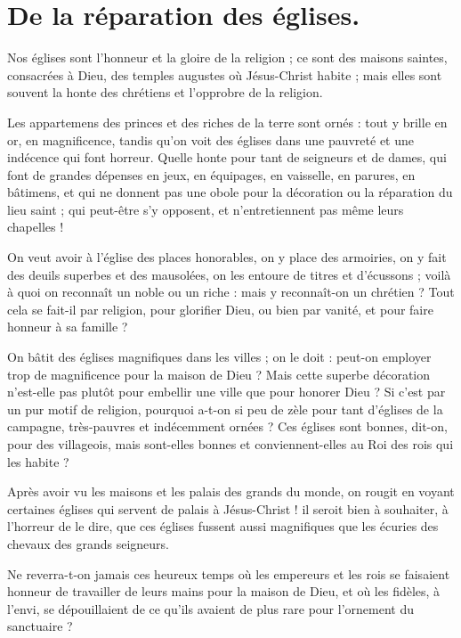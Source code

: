 \documentclass[instructions.tex]{subfiles}
\begin{document}
 
\chapter{De la réparation des églises.}
 
\primo Nos églises sont l’honneur et la gloire de la religion ; ce sont des maisons saintes, consacrées à Dieu, des temples augustes où Jésus-Christ habite ; mais elles sont souvent la honte des chrétiens et l’opprobre de la religion.
 
Les appartemens des princes et des riches de la terre sont ornés : tout y brille en or, en magnificence, tandis qu’on voit des églises dans une pauvreté et une indécence qui font horreur. Quelle honte pour tant de seigneurs et de dames, qui font de grandes dépenses en jeux, en équipages, en vaisselle, en parures, en bâtimens, et qui ne donnent pas une obole pour la décoration ou la réparation du lieu saint ; qui peut-être s’y opposent, et n’entretiennent pas même leurs chapelles !
 
On veut avoir à l’église des places honorables, on y place des armoiries, on y fait des deuils superbes et des mausolées, on les entoure de titres et d’écussons ; voilà à quoi on reconnaît un noble ou un riche : mais y reconnaît-on un chrétien ? Tout cela se fait-il par religion, pour glorifier Dieu, ou bien par vanité, et pour faire honneur à sa famille ?
 
On bâtit des églises magnifiques dans les villes ; on le doit : peut-on employer trop de magnificence pour la maison de Dieu ? Mais cette superbe décoration n’est-elle pas plutôt pour embellir une ville que pour honorer Dieu ? Si c’est par un pur motif de religion, pourquoi a-t-on si peu de zèle pour tant d’églises de la campagne, très-pauvres et indécemment ornées ? Ces églises sont bonnes, dit-on, pour des villageois, mais sont-elles bonnes et conviennent-elles au Roi des rois qui les habite ?
 
Après avoir vu les maisons et les palais des grands du monde, on rougit en voyant certaines églises qui servent de palais à Jésus-Christ ! il seroit bien à souhaiter, à l’horreur de le dire, que ces églises fussent aussi magnifiques que les écuries des chevaux des grands seigneurs.
 
Ne reverra-t-on jamais ces heureux temps où les empereurs et les rois se faisaient honneur de travailler de leurs mains pour la maison de Dieu, et où les fidèles, à l’envi, se dépouillaient de ce qu’ils avaient de plus rare pour l’ornement du sanctuaire ?
 
\end{document}
